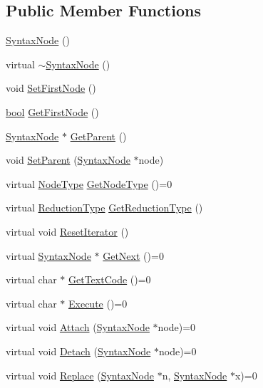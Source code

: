 \subsection*{Public Member Functions}
\begin{DoxyCompactItemize}
\item 
\hyperlink{classSyntaxNode_ac94372d402f38a118b4e8cd20ba7e520}{Syntax\+Node} ()
\item 
virtual \hyperlink{classSyntaxNode_a8fa3db69c423b60a37b50c48bb79bc2b}{$\sim$\+Syntax\+Node} ()
\item 
void \hyperlink{classSyntaxNode_a24e2d5b5e94a67ce55cea52cd48212e6}{Set\+First\+Node} ()
\item 
\hyperlink{platform_8h_a1062901a7428fdd9c7f180f5e01ea056}{bool} \hyperlink{classSyntaxNode_a65e1789edf8ca46865592e9e6e279749}{Get\+First\+Node} ()
\item 
\hyperlink{classSyntaxNode}{Syntax\+Node} $\ast$ \hyperlink{classSyntaxNode_a4a85fd710ad44edbc5b3ac625c10cd08}{Get\+Parent} ()
\item 
void \hyperlink{classSyntaxNode_a7902bb2c389a784c11c2b649a84824e9}{Set\+Parent} (\hyperlink{classSyntaxNode}{Syntax\+Node} $\ast$node)
\item 
virtual \hyperlink{nodes_8h_acac9cbaeea226ed297804c012dc12b16}{Node\+Type} \hyperlink{classSyntaxNode_aef71a18975535d050393f0541b3cdc6a}{Get\+Node\+Type} ()=0
\item 
virtual \hyperlink{nodes_8h_ab321a69ad5704b704b8dd9e1b3984a29}{Reduction\+Type} \hyperlink{classSyntaxNode_a5384fc779eee947b5e09bf2adb6cc606}{Get\+Reduction\+Type} ()
\item 
virtual void \hyperlink{classSyntaxNode_ac51307368fb255aa760b99e137178c89}{Reset\+Iterator} ()
\item 
virtual \hyperlink{classSyntaxNode}{Syntax\+Node} $\ast$ \hyperlink{classSyntaxNode_af1fa46ba30aa4f2affa2d4e96a4be010}{Get\+Next} ()=0
\item 
virtual char $\ast$ \hyperlink{classSyntaxNode_a27f7dd6d00f5c94533477d6d5c2e831c}{Get\+Text\+Code} ()=0
\item 
virtual char $\ast$ \hyperlink{classSyntaxNode_ad8418608fa224536b48a590c87f0a509}{Execute} ()=0
\item 
virtual void \hyperlink{classSyntaxNode_af25fd5963125bb2d6b9a1864b9ff79c8}{Attach} (\hyperlink{classSyntaxNode}{Syntax\+Node} $\ast$node)=0
\item 
virtual void \hyperlink{classSyntaxNode_ae57f629a5c5fa0994f036c105396da69}{Detach} (\hyperlink{classSyntaxNode}{Syntax\+Node} $\ast$node)=0
\item 
virtual void \hyperlink{classSyntaxNode_a2797ff5eb05f3a36ae1be41b70105e05}{Replace} (\hyperlink{classSyntaxNode}{Syntax\+Node} $\ast$n, \hyperlink{classSyntaxNode}{Syntax\+Node} $\ast$x)=0
\end{DoxyCompactItemize}

